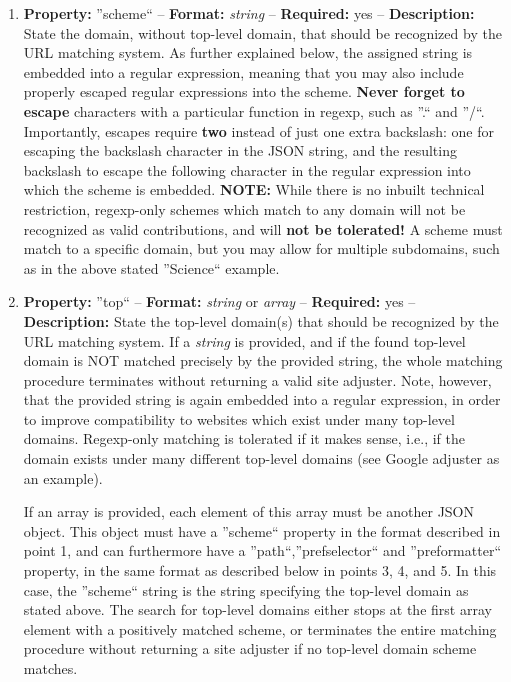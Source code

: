 \documentclass[
a4paper,
12pt,
]
{article}
\begin{document}
 \begin{enumerate}
  \item \textbf{Property:} ''scheme`` -- \textbf{Format:} \textit{string} -- \textbf{Required:} yes -- \textbf{Description:} State the domain, without top-level domain, that should be recognized by the URL matching system. As further explained below, the assigned string is embedded into a regular expression, meaning that you may also include properly escaped regular expressions into the scheme. \textbf{Never forget to escape} characters with a particular function in regexp, such as ''.`` and ''/``. 
  Importantly, escapes require \textbf{two} instead of just one extra backslash: one for escaping the backslash character in the JSON string, and the resulting backslash to escape the following character in the regular expression into which the scheme is embedded.
  \textbf{NOTE:} While there is no inbuilt technical restriction, regexp-only schemes which match to any domain will not be recognized as valid contributions, and will \textbf{not be tolerated!} 
  A scheme must match to a specific domain, but you may allow for multiple subdomains, such as in the above stated ''Science`` example.
  
  \item \textbf{Property:} ''top`` -- \textbf{Format:} \textit{string} or \textit{array} -- \textbf{Required:} yes -- \textbf{Description:} State the top-level domain(s) that should be recognized by the URL matching system. If a \textit{string} is provided, and if the found top-level domain is NOT matched precisely by the provided string, the whole matching procedure terminates without returning a valid site adjuster. Note, however, that the provided string is again embedded into a regular expression, in order to improve compatibility to websites which exist under many top-level domains. 
  Regexp-only matching is tolerated if it makes sense, i.e., if the domain exists under many different top-level domains (see Google adjuster as an example).\par
  
  If an array is provided, each element of this array must be another JSON object. This object must have a ''scheme`` property in the format described in point 1, and can furthermore have a ''path``,''prefselector`` and ''preformatter`` property, in the same format as described below in points 3, 4, and 5. In this case, the ''scheme`` string is the string specifying the top-level domain as stated above. 
  The search for top-level domains either stops at the first array element with a positively matched scheme, or terminates the entire matching procedure without returning a site adjuster if no top-level domain scheme matches.\par
  

\end{enumerate}
\end{document}
